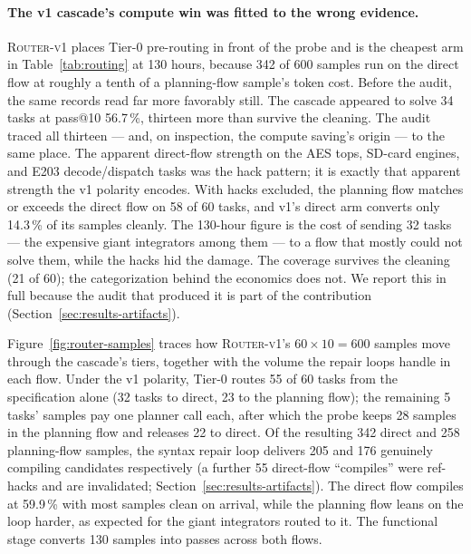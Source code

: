 \paragraph{The v1 cascade's compute win was fitted to the wrong evidence.}
\textsc{Router-v1} places Tier-0 pre-routing in front of the probe and
is the cheapest arm in Table~\ref{tab:routing} at 130 hours, because
342 of 600 samples run on the direct flow at roughly a tenth of a
planning-flow sample's token cost. Before the audit, the same records read far more favorably
still. The cascade appeared to solve 34 tasks at pass@10 56.7\,\%,
thirteen more than survive the cleaning. The audit traced all thirteen --- and, on
inspection, the compute saving's origin --- to the same place. The
apparent direct-flow strength on the AES tops, SD-card engines, and E203
decode/dispatch tasks was the hack pattern; it is exactly that apparent
strength the v1 polarity encodes. With hacks excluded, the planning flow
matches or exceeds the direct flow on 58 of 60 tasks, and v1's direct arm
converts only 14.3\,\% of its samples cleanly. The 130-hour figure
is the cost of sending 32 tasks --- the expensive giant integrators
among them --- to a flow that mostly could not solve them, while the
hacks hid the damage. The coverage survives the cleaning (21 of 60);
the categorization behind the economics does not. We report this in full because the audit that produced it is part
of the contribution (Section~\ref{sec:results-artifacts}).

Figure~\ref{fig:router-samples} traces how \textsc{Router-v1}'s
$60\times10 = 600$ samples move through the cascade's tiers, together
with the volume the repair loops handle in each flow. Under the v1
polarity, Tier-0 routes 55 of 60 tasks from the specification alone
(32 tasks to direct, 23 to the planning flow); the remaining 5 tasks'
samples pay one planner call each, after which the probe keeps 28
samples in the planning flow and releases 22 to direct. Of the resulting
342 direct and 258 planning-flow samples, the syntax repair loop delivers
205 and 176 genuinely compiling candidates respectively (a further 55
direct-flow ``compiles'' were ref-hacks and are invalidated;
Section~\ref{sec:results-artifacts}). The direct flow compiles at
59.9\,\% with most samples clean on arrival, while the planning flow
leans on the loop harder, as expected for the giant integrators routed
to it. The functional stage converts 130 samples into passes across
both flows.


